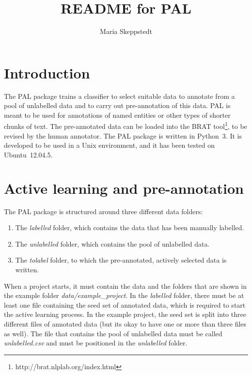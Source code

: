 \documentclass{report}
\begin{document}
\title{README for PAL}
\author{Maria Skeppstedt}

\maketitle
  
\section*{Introduction}
The PAL package trains a classifier to select suitable data to annotate from a pool of unlabelled data and to carry out pre-annotation of this data.  PAL is meant to be used for annotations of named entities or other types of shorter chunks of text. The pre-annotated data can be loaded into the BRAT tool\footnote{http://brat.nlplab.org/index.html}, to be revised by the human annotator. The PAL package is written in Python~3. It is developed to be used in a Unix environment, and it has been tested on Ubuntu~12.04.5. 

\section*{Active learning and pre-annotation}

The PAL package is structured around three different data folders:
\begin{enumerate}
\item The \emph{labelled} folder, which contains the data that has been manually labelled.
\item The \emph{unlabelled} folder, which contains the pool of unlabelled data.
\item The \emph{tolabel} folder, to which the pre-annotated, actively selected data is written. 
\end{enumerate}

When a project starts, it must contain the data and the folders that are shown in the example folder \emph{data/example\_project}. In the \emph{labelled} folder, there must be at least one file containing the seed set of annotated data, which is required to start the active learning process. In the example project, the seed set is split into three different files of annotated data (but its okay to have one or more than three files as well).  The file that contains the pool of unlabelled data must be called \emph{unlabelled.csv} and must be positioned in the \emph{unlabelled} folder.
\end{document}
